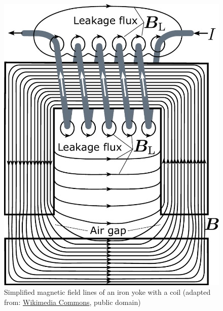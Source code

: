 \begin{frame}
\begin{columns}
\begin{column}{0.425\textwidth}
\begin{figure}
				\includegraphics[height=0.68\textheight]{fig/lec02/Electromagnet_with_gap.pdf}
				\caption{Simplified magnetic field lines of an iron yoke with a coil  (adapted from: \href{https://en.m.wikipedia.org/wiki/File:Electromagnet_with_gap.svg}{Wikimedia Commons}, public domain)}
			\end{figure}
		\end{column}
		\end{columns}
\end{frame}

